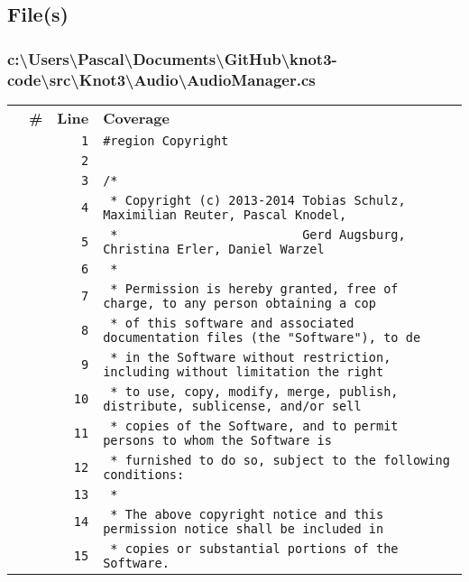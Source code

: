 \documentclass[a4paper,10pt]{article}
\begin{document}
\subsection{File(s)}
\subsubsection{c:\textbackslash Users\textbackslash Pascal\textbackslash Documents\textbackslash GitHub\textbackslash knot3-code\textbackslash src\textbackslash Knot3\textbackslash Audio\textbackslash AudioManager.cs}
\begin{longtable}[l]{lrrl}
\textbf{} & \textbf{\#} & \textbf{Line} & \textbf{Coverage}\\
\cellcolor{gray} &  & \verb~1~ & \verb~#region Copyright~\\
\cellcolor{gray} &  & \verb~2~ & \verb~~\\
\cellcolor{gray} &  & \verb~3~ & \verb~/*~\\
\cellcolor{gray} &  & \verb~4~ & \verb~ * Copyright (c) 2013-2014 Tobias Schulz, Maximilian Reuter, Pascal Knodel,~\\
\cellcolor{gray} &  & \verb~5~ & \verb~ *                         Gerd Augsburg, Christina Erler, Daniel Warzel~\\
\cellcolor{gray} &  & \verb~6~ & \verb~ *~\\
\cellcolor{gray} &  & \verb~7~ & \verb~ * Permission is hereby granted, free of charge, to any person obtaining a cop~\\
\cellcolor{gray} &  & \verb~8~ & \verb~ * of this software and associated documentation files (the "Software"), to de~\\
\cellcolor{gray} &  & \verb~9~ & \verb~ * in the Software without restriction, including without limitation the right~\\
\cellcolor{gray} &  & \verb~10~ & \verb~ * to use, copy, modify, merge, publish, distribute, sublicense, and/or sell~\\
\cellcolor{gray} &  & \verb~11~ & \verb~ * copies of the Software, and to permit persons to whom the Software is~\\
\cellcolor{gray} &  & \verb~12~ & \verb~ * furnished to do so, subject to the following conditions:~\\
\cellcolor{gray} &  & \verb~13~ & \verb~ *~\\
\cellcolor{gray} &  & \verb~14~ & \verb~ * The above copyright notice and this permission notice shall be included in ~\\
\cellcolor{gray} &  & \verb~15~ & \verb~ * copies or substantial portions of the Software.~\\

\end{longtable}
\end{document}
